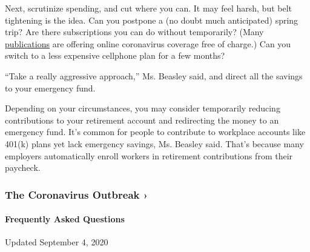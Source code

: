 Next, scrutinize spending, and cut where you can. It may feel harsh, but
belt tightening is the idea. Can you postpone a (no doubt much
anticipated) spring trip? Are there subscriptions you can do without
temporarily? (Many
\href{https://www.adweek.com/digital/major-publishers-take-down-paywalls-for-coronavirus-coverage/}{publications}
are offering online coronavirus coverage free of charge.) Can you switch
to a less expensive cellphone plan for a few months?

``Take a really aggressive approach,'' Ms. Beasley said, and direct all
the savings to your emergency fund.

Depending on your circumstances, you may consider temporarily reducing
contributions to your retirement account and redirecting the money to an
emergency fund. It's common for people to contribute to workplace
accounts like 401(k) plans yet lack emergency savings, Ms. Beasley said.
That's because many employers automatically enroll workers in retirement
contributions from their paycheck.

\href{https://www.nytimes3xbfgragh.onion/news-event/coronavirus?action=click\&pgtype=Article\&state=default\&region=MAIN_CONTENT_3\&context=storylines_faq}{}

\hypertarget{the-coronavirus-outbreak-}{%
\subsubsection{The Coronavirus Outbreak
›}\label{the-coronavirus-outbreak-}}

\hypertarget{frequently-asked-questions}{%
\paragraph{Frequently Asked
Questions}\label{frequently-asked-questions}}

Updated September 4, 2020

